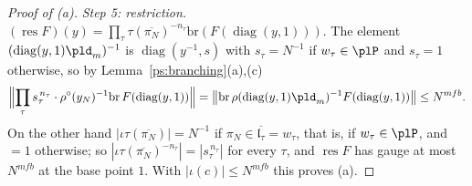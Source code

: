 \documentclass[10pt]{amsart}
\theoremstyle{definition}
\theoremstyle{remark}
\providecommand{\aubar}[1]{\overline{#1}}
\begin{document}
\begin{proof}[Proof of {\rm(a)}]
\emph{Step 5: restriction.} $(\operatorname{res}F)(y)=\prod_\tau\tau(\aubar{\pi_N})^{-n_\tau}
\mathrm{br}(F(\operatorname{diag}(y,1)))$. The element $(\operatorname{diag}(y,1)\pld_m)^{-1}$ is
$\operatorname{diag}(y^{-1},s)$ with $s_\tau=N^{-1}$ if $w_\tau\in\plP$ and $s_\tau=1$ otherwise,
so by Lemma~\ref{ps:branching}(a),(c)
\[
\Bigl\|\prod_\tau s_\tau^{\,n_\tau}\cdot\rho^\circ(y_N)^{-1}\mathrm{br}\,F(\operatorname{diag}(y,1))
\Bigr\|=\bigl\|\mathrm{br}\,\rho(\operatorname{diag}(y,1)\pld_m)^{-1}F(\operatorname{diag}(y,1))
\bigr\|\le N^{mfb}.
\]
On the other hand $|\iota\tau(\aubar{\pi_N})|=N^{-1}$ if $\pi_N\in\aubar{\mathfrak l_\tau}=w_\tau$,
that is, if $w_\tau\in\plP$, and $=1$ otherwise; so $|\iota\tau(\aubar{\pi_N})^{-n_\tau}|=
|s_\tau^{\,n_\tau}|$ for every $\tau$, and $\operatorname{res}F$ has gauge at most $N^{mfb}$ at
the base point $1$. With $|\iota(c)|\le N^{mfb}$ this proves (a).
\end{proof}
\end{document}
